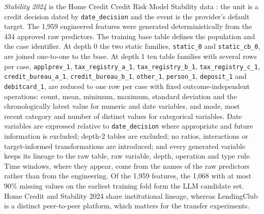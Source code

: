 \documentclass[final,5p,twocolumn]{elsarticle}
\begin{document}
\emph{Stability 2024} is the Home Credit Credit Risk Model Stability data \cite{homecredit2024}: the unit is a credit decision dated by \texttt{date\_decision} and the event is the provider's default target. The 1,959 engineered features were generated deterministically from the 434 approved raw predictors. The training base table defines the population and the case identifier. At depth 0 the two static families, \texttt{static\_0} and \texttt{static\_cb\_0}, are joined one-to-one to the base. At depth 1 ten table families with several rows per case, \texttt{applprev\_1}, \texttt{tax\_registry\_a\_1}, \texttt{tax\_registry\_b\_1}, \texttt{tax\_registry\_c\_1}, \texttt{credit\_bureau\_a\_1}, \texttt{credit\_bureau\_b\_1}, \texttt{other\_1}, \texttt{person\_1}, \texttt{deposit\_1} and \texttt{debitcard\_1}, are reduced to one row per case with fixed outcome-independent operations: count, mean, minimum, maximum, standard deviation and the chronologically latest value for numeric and date variables, and mode, most recent category and number of distinct values for categorical variables. Date variables are expressed relative to \texttt{date\_decision} where appropriate and future information is excluded; depth-2 tables are excluded; no ratios, interactions or target-informed transformations are introduced; and every generated variable keeps its lineage to the raw table, raw variable, depth, operation and type rule. Time windows, where they appear, come from the names of the raw predictors rather than from the engineering. Of the 1,959 features, the 1,068 with at most 90\% missing values on the earliest training fold form the LLM candidate set. Home Credit and Stability 2024 share institutional lineage, whereas LendingClub is a distinct peer-to-peer platform, which matters for the transfer experiments.
\end{document}
